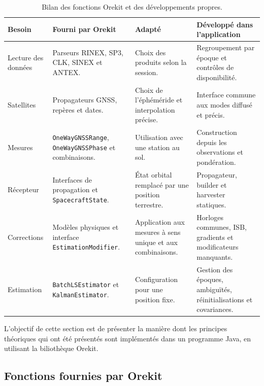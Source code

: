 \begin{table}[htbp]
\centering
\small
\begin{tabularx}{\textwidth}{|>{\raggedright\arraybackslash}p{}|
                                  >{\raggedright\arraybackslash}p{}|
                                  >{\raggedright\arraybackslash}p{}|
                                  >{\raggedright\arraybackslash}X|}
\hline
\textbf{Besoin} & \textbf{Fourni par Orekit} & \textbf{Adapté} &
\textbf{Développé dans l'application} \\
\hline
Lecture des données & Parseurs RINEX, SP3, CLK, SINEX et ANTEX. & Choix des
produits selon la session. & Regroupement par époque et contrôles de
disponibilité. \\
\hline
Satellites & Propagateurs GNSS, repères et dates. & Choix de l'éphéméride et
interpolation précise. & Interface commune aux modes diffusé et précis. \\
\hline
Mesures & \texttt{OneWayGNSSRange}, \texttt{OneWayGNSSPhase} et combinaisons. &
Utilisation avec une station au sol. & Construction depuis les observations et
pondération. \\
\hline
Récepteur & Interfaces de propagation et \texttt{SpacecraftState}. & État
orbital remplacé par une position terrestre. & Propagateur, builder et
harvester statiques. \\
\hline
Corrections & Modèles physiques et interface \texttt{EstimationModifier}. &
Application aux mesures à sens unique et aux combinaisons. & Horloges communes,
ISB, gradients et modificateurs manquants. \\
\hline
Estimation & \texttt{BatchLSEstimator} et \texttt{KalmanEstimator}. &
Configuration pour une position fixe. & Gestion des époques, ambiguïtés,
réinitialisations et covariances. \\
\hline
\end{tabularx}
\caption{Bilan des fonctions Orekit et des développements propres.}
\label{tab:orekit_implementation_summary}
\end{table}
\fi

\iffalse

L'objectif de cette
section est de présenter la manière dont les principes théoriques qui ont été présentés sont
implémentés dans un programme Java, en utilisant la biliothèque Orekit.

\subsection{Fonctions fournies par Orekit}

